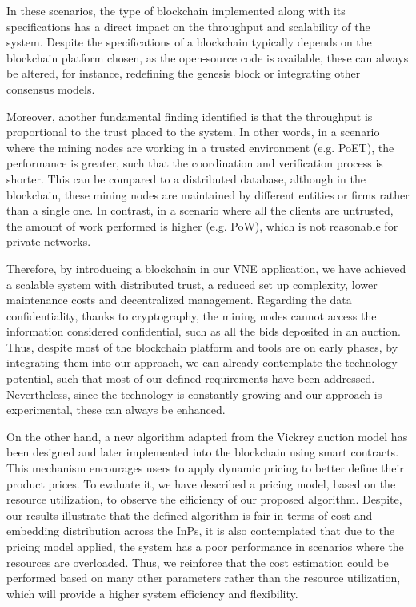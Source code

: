 In these scenarios, the type of blockchain implemented along with its specifications has a direct impact on the throughput and scalability of the system. Despite the specifications of a blockchain typically depends on the blockchain platform chosen, as the open-source code is available, these can always be altered, for instance, redefining the genesis block or integrating other consensus models.

Moreover, another fundamental finding identified is that the throughput is proportional to the trust placed to the system. In other words, in a scenario where the mining nodes are working in a trusted environment (e.g. PoET), the performance is greater, such that the coordination and verification process is shorter. This can be compared to a distributed database, although in the blockchain, these mining nodes are maintained by different entities or firms rather than a single one. In contrast, in a scenario where all the clients are untrusted, the amount of work performed is higher (e.g. PoW), which is not reasonable for private networks. 

Therefore, by introducing a blockchain in our VNE application, we have achieved a scalable system with distributed trust, a reduced set up complexity, lower maintenance costs and decentralized management. Regarding the data confidentiality, thanks to cryptography, the mining nodes cannot access the information considered confidential, such as all the bids deposited in an auction. Thus, despite most of the blockchain platform and tools are on early phases, by integrating them into our approach, we can already contemplate the technology potential, such that most of our defined requirements have been addressed. Nevertheless, since the technology is constantly growing and our approach is experimental, these can always be enhanced.

On the other hand, a new algorithm adapted from the Vickrey auction model has been designed and later implemented into the blockchain using smart contracts. This mechanism encourages users to apply dynamic pricing to better define their product prices. To evaluate it, we have described a pricing model, based on the resource utilization, to observe the efficiency of our proposed algorithm. Despite, our results illustrate that the defined algorithm is fair in terms of cost and embedding distribution across the InPs, it is also contemplated that due to the pricing model applied, the system has a poor performance in scenarios where the resources are overloaded. Thus, we reinforce that the cost estimation could be performed based on many other parameters rather than the resource utilization, which will provide a higher system efficiency and flexibility.

